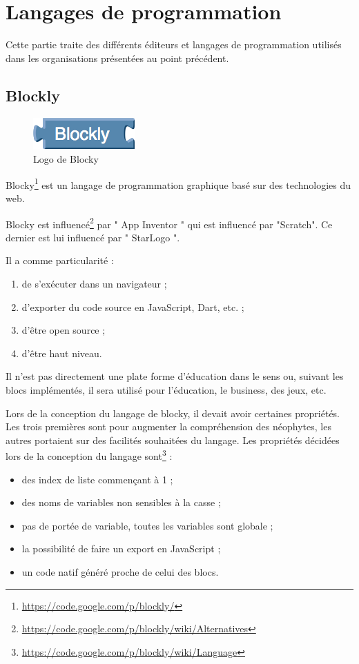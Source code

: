 \section{Langages de programmation}
Cette partie traite des différents éditeurs et langages de programmation utilisés dans les organisations présentées au point précédent.
\subsection{Blockly}
\label{blockly}
\begin{figure}[!h]
  \begin{center}
    \includegraphics[scale=0.5]{content/5-related_work/images/blocky}
    \caption{Logo de Blocky}
    \label{fig:blocky}
  \end{center}
\end{figure}
Blocky\footnote{\url{https://code.google.com/p/blockly/}} est un langage de programmation graphique basé sur des technologies du web. 

Blocky est influencé\footnote{\url{https://code.google.com/p/blockly/wiki/Alternatives}} par " App Inventor " qui est influencé par "Scratch". Ce dernier est lui influencé par " StarLogo ".

Il a comme particularité :
\begin{enumerate}
\item de s'exécuter dans un navigateur ;
\item d'exporter du code source en JavaScript, Dart, etc. ;
\item d'être open source ;
\item d'être haut niveau.
\end{enumerate}

Il n'est pas directement une plate forme d'éducation dans le sens ou, suivant les blocs implémentés, il sera utilisé pour l'éducation, le business, des jeux, etc.

Lors de la conception du langage de blocky, il devait avoir certaines propriétés. Les trois premières sont pour augmenter la compréhension des néophytes, les autres portaient sur des facilités souhaitées du langage. Les propriétés décidées lors de la conception du langage sont\footnote{\url{https://code.google.com/p/blockly/wiki/Language}} :

\begin{itemize}
  \item des index de liste commençant à 1 ;
  \item des noms de variables non sensibles à la casse ;
  \item pas de portée de variable, toutes les variables sont globale ;
  \item la possibilité de faire un export en JavaScript ;
  \item un code natif généré proche de celui des blocs.
\end{itemize}

